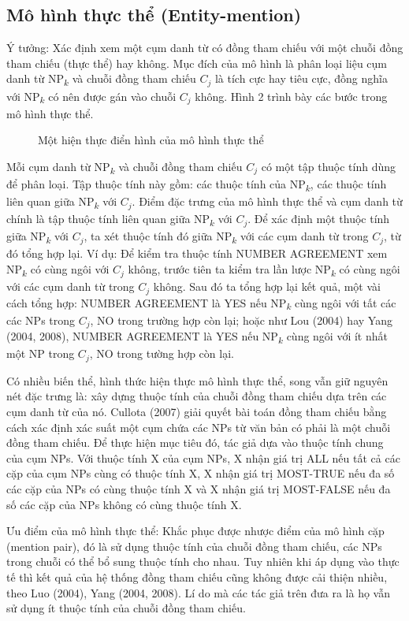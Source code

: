 \documentclass[12pt]{report}
\begin{document}
			\subsection*{Mô hình thực thể (Entity-mention)}
				\par Ý tưởng: Xác định xem một cụm danh từ có đồng tham chiếu với một chuỗi đồng tham chiếu (thực thể) hay không. Mục đích của mô hình là phân loại liệu cụm danh từ NP\textsubscript{$k$} và chuỗi đồng tham chiếu $C_{j}$ là tích cực hay tiêu cực, đồng nghĩa với NP\textsubscript{$k$} có nên được gán vào chuỗi $C_{j}$ không. Hình 2 trình bày các bước trong mô hình thực thể.
				\begin{figure}[H]
					\centering
					
					\caption{Một hiện thực điển hình của mô hình thực thể}
				\end{figure}
				Mỗi cụm danh từ NP\textsubscript{$k$} và chuỗi đồng tham chiếu $C_{j}$ có một tập thuộc tính dùng để phân loại. Tập thuộc tính này gồm: các thuộc tính của NP\textsubscript{$k$}, các thuộc tính liên quan giữa NP\textsubscript{$k$} với $C_{j}$. Điểm đặc trưng của mô hình thực thể và cụm danh từ chính là tập thuộc tính liên quan giữa NP\textsubscript{$k$} với $C_{j}$. Để xác định một thuộc tính giữa NP\textsubscript{$k$} với $C_{j}$, ta xét thuộc tính đó giữa NP\textsubscript{$k$} với các cụm danh từ trong $C_{j}$, từ đó tổng hợp lại. Ví dụ: Để kiểm tra thuộc tính NUMBER AGREEMENT xem NP\textsubscript{$k$} có cùng ngôi với $C_{j}$ không, trước tiên ta kiểm tra lần lược NP\textsubscript{$k$} có cùng ngôi với các cụm danh từ trong $C_{j}$ không. Sau đó ta tổng hợp lại kết quả, một vài cách tổng hợp: NUMBER AGREEMENT là YES nếu NP\textsubscript{$k$} cùng ngôi với tất các các NPs trong $C_{j}$, NO trong trường hợp còn lại; hoặc như Lou (2004)\cite{lou04} hay Yang (2004, 2008)\cite{yang04}\cite{yang08}, NUMBER AGREEMENT là YES nếu NP\textsubscript{$k$} cùng ngôi với ít nhất một NP trong $C_{j}$, NO trong tường hợp còn lại.
				\par Có nhiều biến thể, hình thức hiện thực mô hình thực thể, song vẫn giữ nguyên nét đặc trưng là: xây dựng thuộc tính của chuỗi đồng tham chiếu dựa trên các cụm danh từ của nó. Cullota (2007)\cite{culotta07} giải quyết bài toán đồng tham chiếu bằng cách xác định xác suất một cụm chứa các NPs từ văn bản có phải là một chuỗi đồng tham chiếu. Để thực hiện mục tiêu đó, tác giả dựa vào thuộc tính chung của cụm NPs. Với thuộc tính X của cụm NPs, X nhận giá trị ALL nếu tất cả các cặp của cụm NPs cùng có thuộc tính X, X nhận giá trị MOST-TRUE nếu đa số các cặp của NPs có cùng thuộc tính X và X nhận giá trị MOST-FALSE nếu đa số các cặp của NPs không có cùng thuộc tính X. 
				\par Ưu điểm của mô hình thực thể: Khắc phục được nhược điểm của mô hình cặp (mention pair), đó là sử dụng thuộc tính của chuỗi đồng tham chiếu, các NPs trong chuỗi có thể bổ sung thuộc tính cho nhau. Tuy nhiên khi áp dụng vào thực tế thì kết quả của hệ thống đồng tham chiếu cũng không được cải thiện nhiều, theo Luo (2004)\cite{lou04}, Yang (2004, 2008)\cite{yang04}\cite{yang08}. Lí do mà các tác giả trên đưa ra là họ vẫn sử dụng ít thuộc tính của chuỗi đồng tham chiếu.
\end{document}
